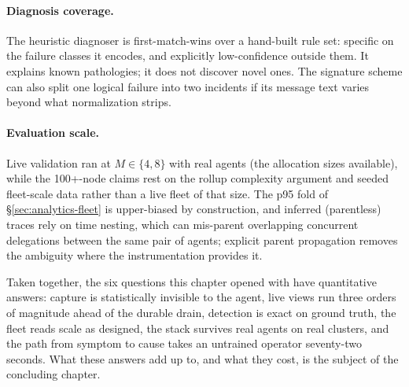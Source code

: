 \paragraph{Diagnosis coverage.} The heuristic diagnoser is
first-match-wins over a hand-built rule set: specific on the failure
classes it encodes, and explicitly low-confidence outside them. It
explains known pathologies; it does not discover novel ones. The
signature scheme can also split one logical failure into two incidents if
its message text varies beyond what normalization strips.

\paragraph{Evaluation scale.} Live validation ran at $M \in \{4, 8\}$
with real agents (the allocation sizes available), while the
100+-node claims rest on the rollup complexity argument and seeded
fleet-scale data rather than a live fleet of that size. The p95 fold of
\S\ref{sec:analytics-fleet} is upper-biased by construction, and
inferred (parentless) traces rely on time nesting, which can
mis-parent overlapping concurrent delegations between the same pair of
agents; explicit parent propagation removes the ambiguity where the
instrumentation provides it.

\medskip

Taken together, the six questions this chapter opened with have
quantitative answers: capture is statistically invisible to the agent,
live views run three orders of magnitude ahead of the durable drain,
detection is exact on ground truth, the fleet reads scale as designed,
the stack survives real agents on real clusters, and the path from
symptom to cause takes an untrained operator seventy-two seconds. What
these answers add up to, and what they cost, is the subject of the
concluding chapter.
